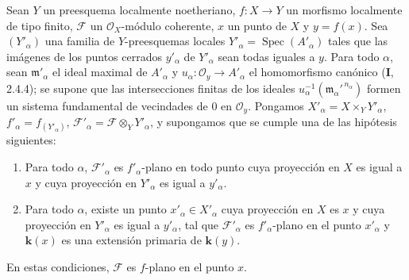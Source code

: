 \begin{theorem}[11.5.1]
\label{IV.11.5.1}
Sean $Y$ un preesquema localmente noetheriano, $f:X\to Y$ un
morfismo localmente de tipo finito, $\mathcal F$ un $\mathcal O_X$-módulo coherente, $x$ un punto de $X$ y $y=f(x)$. Sea $(Y'_\alpha)$
una familia de $Y$-preesquemas locales $Y'_\alpha=\operatorname{Spec}(A'_\alpha)$ tales que las imágenes de los puntos cerrados $y'_\alpha$
de $Y'_\alpha$ sean todas iguales a $y$. Para todo $\alpha$, sean $\mathfrak m'_\alpha$ el ideal maximal de $A'_\alpha$ y $u_\alpha:\mathcal O_y\to A'_\alpha$
el homomorfismo canónico \textup{(\textbf I, 2.4.4)}; se supone que las intersecciones finitas de los ideales
$u_\alpha^{-1}(\mathfrak m_\alpha'^{\,n_\alpha})$
formen un sistema fundamental de vecindades de $0$ en $\mathcal O_y$. Pongamos $X'_\alpha=X\times_Y Y'_\alpha$, $f'_\alpha=f_{(Y'_\alpha)}$,
$\mathcal F'_\alpha=\mathcal F\otimes_Y Y'_\alpha$, y supongamos que se cumple \textup{una} de las hipótesis siguientes:
\begin{enumerate}[label=\textup{(\roman*)}]
  \item Para todo $\alpha$, $\mathcal F'_\alpha$ es $f'_\alpha$-plano en \textup{todo} punto cuya proyección en $X$ es igual
  a $x$ y cuya proyección en $Y'_\alpha$ es igual a $y'_\alpha$.
  \item Para todo $\alpha$, existe un punto $x'_\alpha\in X'_\alpha$ cuya proyección en $X$ es $x$ y cuya proyección en $Y'_\alpha$
  es igual a $y'_\alpha$, tal que $\mathcal F'_\alpha$ es $f'_\alpha$-plano en el punto $x'_\alpha$ y $\boldsymbol{k}(x)$ es una extensión primaria de $\boldsymbol{k}(y)$.
\end{enumerate}

En estas condiciones, $\mathcal F$ es $f$-plano en el punto $x$.
\end{theorem}

